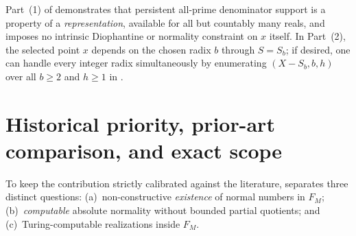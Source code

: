\documentclass[11pt]{article}
\begin{document}
\begin{remark}\label{rem:rep-scope}
Part~(1) of  demonstrates that persistent all-prime denominator support is a property of a \emph{representation}, available for all but countably many reals, and imposes no intrinsic Diophantine or normality constraint on $x$ itself. In Part~(2), the selected point $x$ depends on the chosen radix $b$ through $S=S_b$; if desired, one can handle every integer radix simultaneously by enumerating $(X-S_b,b,h)$ over all $b\ge2$ and $h\ge1$ in .
\end{remark}

\section{Historical priority, prior-art comparison, and exact scope}\label{sec:prior}

To keep the contribution strictly calibrated against the literature,  separates three distinct questions: (a)~non-constructive \emph{existence} of normal numbers in $F_M$; (b)~\emph{computable} absolute normality without bounded partial quotients; and (c)~Turing-computable realizations inside $F_M$.
\end{document}
